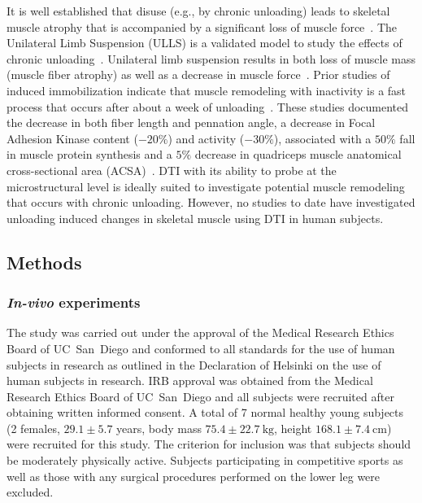 It is well established that disuse (e.g., by chronic unloading) leads to skeletal muscle atrophy that is accompanied by a significant loss of muscle force~\cite{RNS1}.
The Unilateral Limb Suspension (ULLS) is a validated model to study the effects of chronic unloading~\cite{RNS8}.
Unilateral limb suspension results in both loss of muscle mass (muscle fiber atrophy) as well as a decrease in muscle force~\cite{RNS8}.
Prior studies of induced immobilization indicate that muscle remodeling with inactivity is a fast process that occurs after about a week of unloading~\cite{RNS8, RNS5}.
These studies documented the decrease in both fiber length and pennation angle, a decrease in Focal Adhesion Kinase content ($-20\%$) and activity ($-30\%$), associated with a $50\%$ fall in muscle protein synthesis and a $5\%$ decrease in quadriceps muscle anatomical cross-sectional area (ACSA)~\cite{RNS8, RNS5}.
DTI with its ability to probe at the microstructural level is ideally suited to investigate potential muscle remodeling that occurs with chronic unloading.
However, no studies to date have investigated unloading induced changes in skeletal muscle using DTI in human subjects.
\subsection{Methods}
\subsubsection{\textit{In-vivo} experiments}
The study was carried out under the approval of the Medical Research Ethics Board of UC~San~Diego and conformed to all standards for the use of human subjects in research as outlined in the Declaration of Helsinki on the use of human subjects in research.
IRB approval was obtained from the Medical Research Ethics Board of UC~San~Diego and all subjects were recruited after obtaining written informed consent. A total of 7 normal healthy young subjects (2 females, $29.1 \pm 5.7$ years, body mass $75.4 \pm \SI{22.7}{\kilogram}$, height $168.1 \pm \SI{7.4}{\centi\meter}$) were recruited for this study.
The criterion for inclusion was that subjects should be moderately physically active. Subjects participating in competitive sports as well as those with any surgical procedures performed on the lower leg were excluded.
